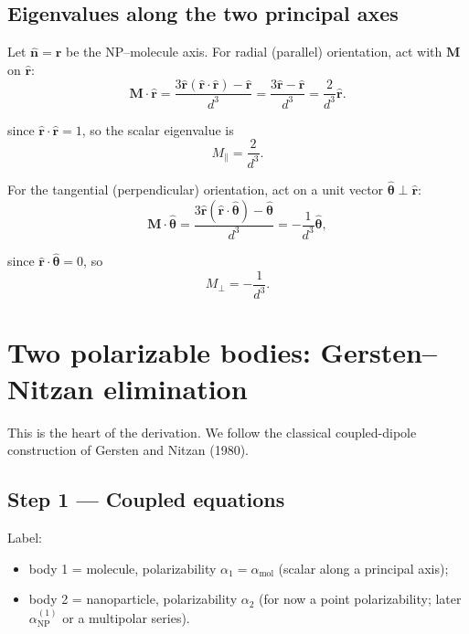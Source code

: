 \documentclass[11pt,a4paper]{article}
\theoremstyle{definition}
\newcommand{\alpham}{\alpha_{\text{mol}}}
\newcommand{\alphanp}{\alpha_{\text{NP}}}
\newcommand{\rhat}{\hat{\mathbf{r}}}
\newcommand{\thetahat}{\hat{\boldsymbol{\theta}}}
\newcommand{\nhat}{\hat{\mathbf{n}}}
\begin{document}
\subsection{Eigenvalues along the two principal axes}

\noindent
Let $\nhat=\rhat$ be the NP--molecule axis. For radial (parallel) orientation, act with $\mathbf{M}$ on $\rhat$:
\begin{equation}
  \mathbf{M}\cdot\rhat
  =
  \frac{3\rhat(\rhat\cdot\rhat)-\rhat}{d^3}
  =
  \frac{3\rhat-\rhat}{d^3}
  =
  \frac{2}{d^3}\rhat.
\end{equation}

\noindent
since \( \rhat \cdot \rhat = 1 \), so the scalar eigenvalue is
\begin{equation}
  M_\parallel = \frac{2}{d^3}.
  \label{eq:M-par}
\end{equation}

\noindent For the tangential (perpendicular) orientation, act on a unit vector $\thetahat\perp\rhat$:
\begin{equation}
  \mathbf{M}\cdot\thetahat
  =
  \frac{3\rhat(\rhat\cdot\thetahat)-\thetahat}{d^3}
  =
  -\frac{1}{d^3}\thetahat,
\end{equation}

\noindent
since \( \rhat \cdot \thetahat = 0 \), so
\begin{equation}
  M_\perp = -\frac{1}{d^3}.
  \label{eq:M-perp}
\end{equation}

\section{Two polarizable bodies: Gersten--Nitzan elimination}

\noindent
This is the heart of the derivation. We follow the classical coupled-dipole construction of Gersten and Nitzan (1980).

\subsection{Step 1 --- Coupled equations}

\noindent
Label:

\begin{itemize}[leftmargin=1.6em]
  \item body 1 = molecule, polarizability $\alpha_1=\alpham$ (scalar along a principal axis);
  \item body 2 = nanoparticle, polarizability $\alpha_2$ (for now a point polarizability; later $\alphanp^{(1)}$ or a multipolar series).
\end{itemize}
\end{document}
